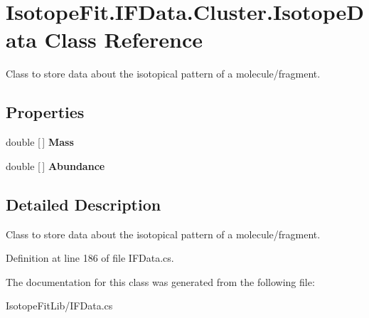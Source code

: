 \hypertarget{class_isotope_fit_1_1_i_f_data_1_1_cluster_1_1_isotope_data}{}\section{Isotope\+Fit.\+I\+F\+Data.\+Cluster.\+Isotope\+Data Class Reference}
\label{class_isotope_fit_1_1_i_f_data_1_1_cluster_1_1_isotope_data}


Class to store data about the isotopical pattern of a molecule/fragment.  


\subsection*{Properties}
\begin{DoxyCompactItemize}
\item 
\mbox{\label{class_isotope_fit_1_1_i_f_data_1_1_cluster_1_1_isotope_data_afbbe848f60b456135ea622abf0644d1b}} 
double \mbox{[}$\,$\mbox{]} {\bfseries Mass}
\item 
\mbox{\label{class_isotope_fit_1_1_i_f_data_1_1_cluster_1_1_isotope_data_aa0f17487c627ed87bedc9cbd2670fc09}} 
double \mbox{[}$\,$\mbox{]} {\bfseries Abundance}
\end{DoxyCompactItemize}


\subsection{Detailed Description}
Class to store data about the isotopical pattern of a molecule/fragment. 



Definition at line 186 of file I\+F\+Data.\+cs.



The documentation for this class was generated from the following file\+:\begin{DoxyCompactItemize}
\item 
Isotope\+Fit\+Lib/I\+F\+Data.\+cs\end{DoxyCompactItemize}
